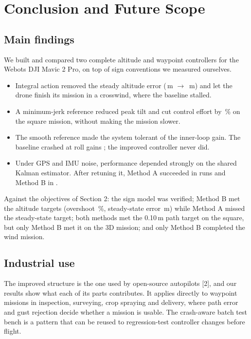 \section{Conclusion and Future Scope}
\subsection{Main findings}
We built and compared two complete altitude and waypoint controllers for the Webots DJI Mavic 2 Pro, on top of sign conventions we measured ourselves.
\begin{itemize}[itemsep=0pt,topsep=2pt]
\item Integral action removed the steady altitude error (\,m $\to$ \,m) and let the drone finish its mission in a crosswind, where the baseline stalled.
\item A minimum-jerk reference reduced peak tilt and cut control effort by \,\% on the square mission, without making the mission slower.
\item The smooth reference made the system tolerant of the inner-loop gain. The baseline crashed at roll gains ; the improved controller never did.
\item Under GPS and IMU noise, performance depended strongly on the shared Kalman estimator. After retuning it, Method A succeeded in  runs and Method B in .
\end{itemize}
Against the objectives of Section 2: the sign model was verified; Method B met the altitude targets (overshoot \,\%, steady-state error \,m) while Method A missed the steady-state target; both methods met the 0.10\,m path target on the square, but only Method B met it on the 3D mission; and only Method B completed the wind mission.

\subsection{Industrial use}
The improved structure is the one used by open-source autopilots [2], and our results show what each of its parts contributes. It applies directly to waypoint missions in inspection, surveying, crop spraying and delivery, where path error and gust rejection decide whether a mission is usable. The crash-aware batch test bench is a pattern that can be reused to regression-test controller changes before flight.

